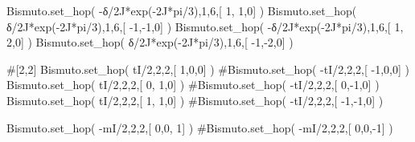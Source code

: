 \documentclass[
  letterpaper,
  DIV=11,
  numbers=noendperiod]{scrreprt}
\newenvironment{Shaded}{\begin{snugshade}}{\end{snugshade}}
\newcommand{\CommentTok}[1]{\textcolor[rgb]{0.37,0.37,0.37}{#1}}
\newcommand{\DecValTok}[1]{\textcolor[rgb]{0.68,0.00,0.00}{#1}}
\newcommand{\NormalTok}[1]{\textcolor[rgb]{0.00,0.23,0.31}{#1}}
\newcommand{\OperatorTok}[1]{\textcolor[rgb]{0.37,0.37,0.37}{#1}}
\newcommand{\OtherTok}[1]{\textcolor[rgb]{0.00,0.23,0.31}{#1}}
\begin{document}
\begin{Shaded}
\begin{Highlighting}[]
\NormalTok{Bismuto.set\_hop(  }\OperatorTok{{-}}\NormalTok{δ}\OperatorTok{/}\OtherTok{2J}\OperatorTok{*}\NormalTok{exp(}\OperatorTok{{-}}\OtherTok{2J}\OperatorTok{*}\NormalTok{pi}\OperatorTok{/}\DecValTok{3}\NormalTok{),}\DecValTok{1}\NormalTok{,}\DecValTok{6}\NormalTok{,[  }\DecValTok{1}\NormalTok{, }\DecValTok{1}\NormalTok{,}\DecValTok{0}\NormalTok{] )  }
\NormalTok{Bismuto.set\_hop(   δ}\OperatorTok{/}\OtherTok{2J}\OperatorTok{*}\NormalTok{exp(}\OperatorTok{{-}}\OtherTok{2J}\OperatorTok{*}\NormalTok{pi}\OperatorTok{/}\DecValTok{3}\NormalTok{),}\DecValTok{1}\NormalTok{,}\DecValTok{6}\NormalTok{,[ }\OperatorTok{{-}}\DecValTok{1}\NormalTok{,}\OperatorTok{{-}}\DecValTok{1}\NormalTok{,}\DecValTok{0}\NormalTok{] ) }
\NormalTok{Bismuto.set\_hop(  }\OperatorTok{{-}}\NormalTok{δ}\OperatorTok{/}\OtherTok{2J}\OperatorTok{*}\NormalTok{exp(}\OperatorTok{{-}}\OtherTok{2J}\OperatorTok{*}\NormalTok{pi}\OperatorTok{/}\DecValTok{3}\NormalTok{),}\DecValTok{1}\NormalTok{,}\DecValTok{6}\NormalTok{,[  }\DecValTok{1}\NormalTok{, }\DecValTok{2}\NormalTok{,}\DecValTok{0}\NormalTok{] )  }
\NormalTok{Bismuto.set\_hop(   δ}\OperatorTok{/}\OtherTok{2J}\OperatorTok{*}\NormalTok{exp(}\OperatorTok{{-}}\OtherTok{2J}\OperatorTok{*}\NormalTok{pi}\OperatorTok{/}\DecValTok{3}\NormalTok{),}\DecValTok{1}\NormalTok{,}\DecValTok{6}\NormalTok{,[ }\OperatorTok{{-}}\DecValTok{1}\NormalTok{,}\OperatorTok{{-}}\DecValTok{2}\NormalTok{,}\DecValTok{0}\NormalTok{] )}
\end{Highlighting}
\end{Shaded}

\begin{Shaded}
\begin{Highlighting}[]
\CommentTok{\#[2,2]}
\NormalTok{Bismuto.set\_hop( tI}\OperatorTok{/}\DecValTok{2}\NormalTok{,}\DecValTok{2}\NormalTok{,}\DecValTok{2}\NormalTok{,[  }\DecValTok{1}\NormalTok{,}\DecValTok{0}\NormalTok{,}\DecValTok{0}\NormalTok{] ) }
\CommentTok{\#Bismuto.set\_hop( {-}tI/2,2,2,[ {-}1,0,0] ) }
\NormalTok{Bismuto.set\_hop( tI}\OperatorTok{/}\DecValTok{2}\NormalTok{,}\DecValTok{2}\NormalTok{,}\DecValTok{2}\NormalTok{,[ }\DecValTok{0}\NormalTok{, }\DecValTok{1}\NormalTok{,}\DecValTok{0}\NormalTok{] ) }
\CommentTok{\#Bismuto.set\_hop( {-}tI/2,2,2,[ 0,{-}1,0] ) }
\NormalTok{Bismuto.set\_hop( tI}\OperatorTok{/}\DecValTok{2}\NormalTok{,}\DecValTok{2}\NormalTok{,}\DecValTok{2}\NormalTok{,[  }\DecValTok{1}\NormalTok{, }\DecValTok{1}\NormalTok{,}\DecValTok{0}\NormalTok{] )}
\CommentTok{\#Bismuto.set\_hop( {-}tI/2,2,2,[ {-}1,{-}1,0] ) }

\NormalTok{Bismuto.set\_hop( }\OperatorTok{{-}}\NormalTok{mI}\OperatorTok{/}\DecValTok{2}\NormalTok{,}\DecValTok{2}\NormalTok{,}\DecValTok{2}\NormalTok{,[ }\DecValTok{0}\NormalTok{,}\DecValTok{0}\NormalTok{, }\DecValTok{1}\NormalTok{] ) }
\CommentTok{\#Bismuto.set\_hop( {-}mI/2,2,2,[ 0,0,{-}1] ) }
\end{Highlighting}
\end{Shaded}
\end{document}
